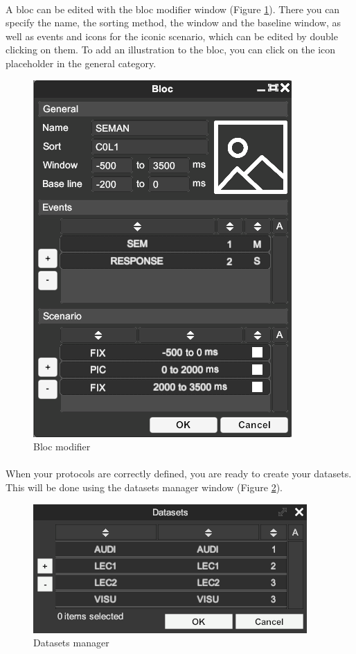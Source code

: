 \documentclass[a4paper]{article}
\begin{document}
\paragraph{} A bloc can be edited with the bloc modifier window (Figure \ref{blocModifierUI}). There you can specify the name, the sorting method, the window and the baseline window, as well as events and icons for the iconic scenario, which can be edited by double clicking on them. To add an illustration to the bloc, you can click on the icon placeholder in the general category.
\begin{figure}[H]
\begin{center}
\includegraphics[scale=0.5]{BlocModifier.png}
\end{center}
\caption{\label{blocModifierUI}Bloc modifier}
\end{figure}
\paragraph{} When your protocols are correctly defined, you are ready to create your datasets. This will be done using the datasets manager window (Figure \ref{datasetGestionUI}).
\begin{figure}[H]
\begin{center}
\includegraphics[scale=0.5]{DatasetGestion.png}
\end{center}
\caption{\label{datasetGestionUI}Datasets manager}
\end{figure}
\end{document}
